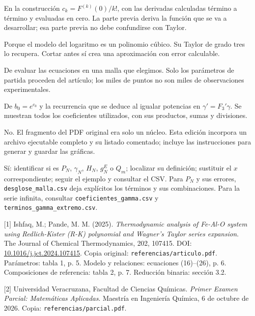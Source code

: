 En la construcción $c_k=F^{(k)}(0)/k!$, con las derivadas calculadas término a término y evaluadas en cero. La parte previa deriva la función que se va a desarrollar; esa parte previa no debe confundirse con Taylor.

Porque el modelo del logaritmo es un polinomio cúbico. Su Taylor de grado tres lo recupera. Cortar antes sí crea una aproximación con error calculable.

De evaluar las ecuaciones en una malla que elegimos. Solo los parámetros de partida proceden del artículo; los miles de puntos no son miles de observaciones experimentales.

De $b_0=e^{c_0}$ y la recurrencia que se deduce al igualar potencias en $\gamma'=F_3'\gamma$. Se muestran todos los coeficientes utilizados, con sus productos, sumas y divisiones.

No. El fragmento del PDF original era solo un núcleo. Esta edición incorpora un archivo ejecutable completo y su listado comentado; incluye las instrucciones para generar y guardar las gráficas.

Sí: identificar si es $P_N$, $\gamma_N$, $H_N$, $g_N^E$ o $Q_m$; localizar su definición; sustituir el $x$ correspondiente; seguir el ejemplo y consultar el CSV. Para $P_N$ y sus errores, \texttt{desglose\_malla.csv} deja explícitos los términos y sus combinaciones. Para la serie infinita, consultar \texttt{coeficientes\_gamma.csv} y \texttt{terminos\_gamma\_extremo.csv}.

[1] Ishfaq, M.; Pande, M. M. (2025). \textit{Thermodynamic analysis of Fe-Al-O system using Redlich-Kister (R-K) polynomial and Wagner's Taylor series expansion}. The Journal of Chemical Thermodynamics, 202, 107415. DOI: \href{https://doi.org/10.1016/j.jct.2024.107415}{10.1016/j.jct.2024.107415}. Copia original: \texttt{referencias/articulo.pdf}. Parámetros: tabla 1, p. 5. Modelo y relaciones: ecuaciones (16)--(26), p. 6. Composiciones de referencia: tabla 2, p. 7. Reducción binaria: sección 3.2.

[2] Universidad Veracruzana, Facultad de Ciencias Químicas. \textit{Primer Examen Parcial: Matemáticas Aplicadas}. Maestría en Ingeniería Química, 6 de octubre de 2026. Copia: \texttt{referencias/parcial.pdf}.

